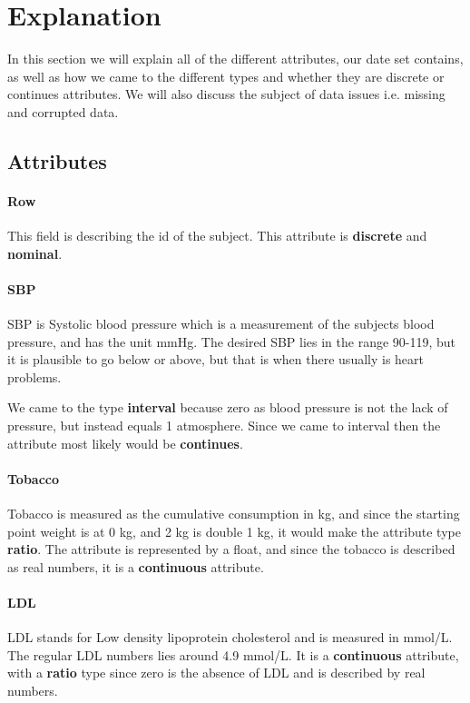 \section{Explanation}
In this section we will explain all of the different attributes, our date set contains, as well as how we came to the different types and whether they are discrete or continues attributes. We will also discuss the subject of data issues i.e. missing and corrupted data.

\subsection{Attributes}

\paragraph{Row} This field is describing the id of the subject. This attribute is \textbf{discrete} and \textbf{nominal}.

\paragraph{SBP} SBP is Systolic blood pressure which is a measurement of the subjects blood pressure, and has the unit mmHg. The desired SBP lies in the range 90-119, but it is plausible to go below or above, but that is when there usually is heart problems.

We came to the type \textbf{interval} because zero as blood pressure is not the lack of pressure, but instead equals 1 atmosphere. Since we came to interval then the attribute most likely would be \textbf{continues}.

\paragraph{Tobacco} Tobacco is measured as the cumulative consumption in kg, and since the starting point weight is at 0 kg, and 2 kg is double 1 kg, it would make the attribute type \textbf{ratio}.  The attribute is represented by a float, and since the tobacco is described as real numbers, it is a \textbf{continuous} attribute.

\paragraph{LDL} LDL stands for Low density lipoprotein cholesterol and is measured in mmol/L. The regular LDL numbers lies around 4.9 mmol/L. It is a \textbf{continuous} attribute, with a \textbf{ratio} type since zero is the absence of LDL and is described by real numbers.

